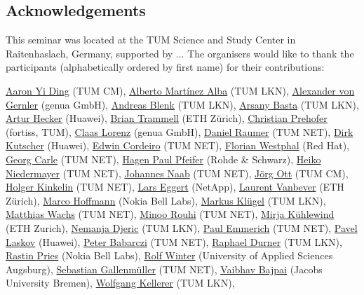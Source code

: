 \subsection*{Acknowledgements}\label{sec:acknowledgement}

This seminar was located at the TUM Science and Study Center in Raitenhaslach,
Germany, supported by ...  The organisers would like to thank the participants
(alphabetically ordered by first name) for their contributions:

\href{}{Aaron Yi Ding} (TUM CM),
\href{}{Alberto Martínez Alba} (TUM LKN),
\href{}{Alexander von Gernler} (genua GmbH),
\href{}{Andreas Blenk} (TUM LKN),
\href{}{Arsany Basta} (TUM LKN),
\href{}{Artur Hecker} (Huawei),
\href{}{Brian Trammell} (ETH Zürich),
\href{}{Christian Prehofer} (fortiss, TUM),
\href{}{Claas Lorenz} (genua GmbH),
\href{}{Daniel Raumer} (TUM NET),
\href{}{Dirk Kutscher} (Huawei),
\href{}{Edwin Cordeiro} (TUM NET),
\href{}{Florian Westphal} (Red Hat),
\href{}{Georg Carle} (TUM NET),
\href{}{Hagen Paul Pfeifer} (Rohde \& Schwarz),
\href{}{Heiko Niedermayer} (TUM NET),
\href{}{Johannes Naab} (TUM NET),
\href{}{Jörg Ott} (TUM CM),
\href{}{Holger Kinkelin} (TUM NET),
\href{}{Lars Eggert} (NetApp),
\href{}{Laurent Vanbever} (ETH Zürich),
\href{}{Marco Hoffmann} (Nokia Bell Labs),
\href{}{Markus Klügel} (TUM LKN),
\href{}{Matthias Wachs} (TUM NET),
\href{}{Minoo Rouhi} (TUM NET),
\href{}{Mirja Kühlewind} (ETH Zurich),
\href{}{Nemanja Djeric} (TUM LKN),
\href{}{Paul Emmerich} (TUM NET),
\href{}{Pavel Laskov} (Huawei),
\href{}{Peter Babarczi} (TUM NET),
\href{}{Raphael Durner} (TUM LKN),
\href{}{Rastin Pries} (Nokia Bell Labs),
\href{}{Rolf Winter} (University of Applied Sciences Augsburg),
\href{}{Sebastian Gallenmüller} (TUM NET),
\href{}{Vaibhav Bajpai} (Jacobs University Bremen),
\href{}{Wolfgang Kellerer} (TUM LKN),

